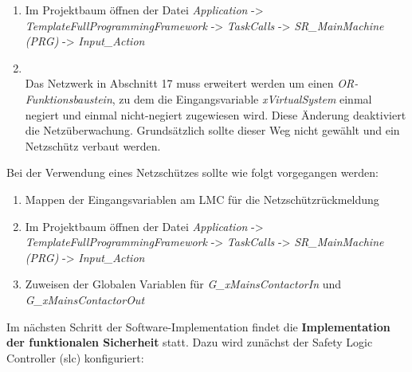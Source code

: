 \documentclass[../../../Bachelorarbeit.tex]{subfiles}
\begin{document}
\begin{enumerate}
    \item Im Projektbaum öffnen der Datei \textit{Application} -> \textit{TemplateFullProgrammingFramework} -> \textit{TaskCalls} -> \textit{SR\_MainMachine (PRG)} -> \textit{Input\_Action}
    \item \begin{minipage}[t]{\linewidth}
        \raggedright
        \label{fig:my-img39}
    \end{minipage}
    \bigskip \\
    Das Netzwerk in Abschnitt 17 muss erweitert werden um einen \textit{OR-Funktionsbaustein}, zu dem die Eingangsvariable \textit{xVirtualSystem} einmal negiert und einmal nicht-negiert zugewiesen wird. Diese Änderung deaktiviert die Netzüberwachung. Grundsätzlich sollte dieser Weg nicht gewählt und ein Netzschütz verbaut werden. 
\end{enumerate}

Bei der Verwendung eines Netzschützes sollte wie folgt vorgegangen werden:

\begin{enumerate}
    \item Mappen der Eingangsvariablen am LMC für die Netzschützrückmeldung
    \item Im Projektbaum öffnen der Datei \textit{Application} -> \textit{TemplateFullProgrammingFramework} -> \textit{TaskCalls} -> \textit{SR\_MainMachine (PRG)} -> \textit{Input\_Action}
    \item Zuweisen der Globalen Variablen für \textit{G\_xMainsContactorIn} und \\ \textit{G\_xMainsContactorOut}
\end{enumerate}

Im nächsten Schritt der Software-Implementation findet die \textbf{Implementation der funktionalen Sicherheit} statt. Dazu wird zunächst der Safety Logic Controller (\acs{slc}) konfiguriert:
\end{document}
